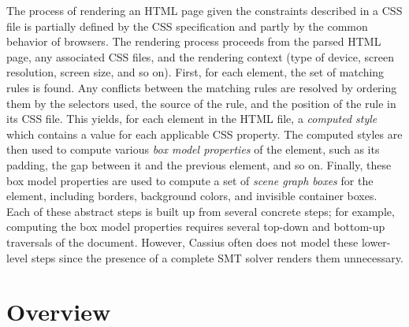 \documentclass[10pt]{sigplanconf}
\newcommand{\name}{Cassius\xspace}
\begin{document}
The process of rendering an HTML page
  given the constraints described in a CSS file is partially defined
  by the CSS specification and partly by the common behavior of browsers.
The rendering process proceeds from the parsed HTML page,
  any associated CSS files, and the rendering context
  (type of device, screen resolution, screen size, and so on).
First, for each element, the set of matching rules is found.
Any conflicts between the matching rules are resolved
  by ordering them by the selectors used, the source of the rule,
  and the position of the rule in its CSS file.
This yields, for each element in the HTML file,
  a \textit{computed style} which contains a value
  for each applicable CSS property.
The computed styles are then used to compute various
  \textit{box model properties} of the element,
  such as its padding, the gap between it and the previous element, and so on.
Finally, these box model properties are used
  to compute a set of \textit{scene graph boxes} for the element,
  including borders, background colors, and invisible container boxes.
Each of these abstract steps is built up from several concrete steps;
  for example, computing the box model properties requires
  several top-down and bottom-up traversals of the document.
However, \name often does not model these lower-level steps
  since the presence of a complete SMT solver
  renders them unnecessary.

\section{Overview}
\end{document}
